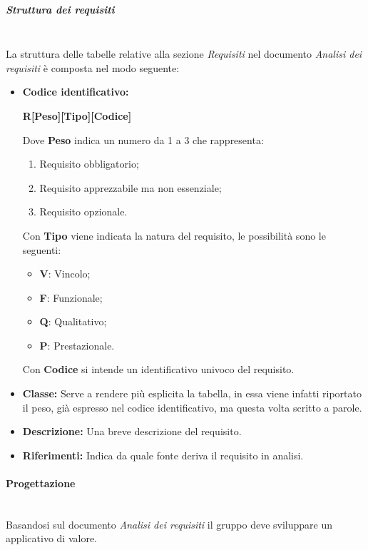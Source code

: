 \subparagraph{Struttura dei requisiti}
\mbox{} \\
La struttura delle tabelle relative alla sezione \textit{Requisiti} nel documento \textit{Analisi dei requisiti} è composta nel modo seguente:
\begin{itemize}
    \item   \textbf{Codice identificativo:}
            \par \centerline{\textbf{R[Peso][Tipo][Codice]}}
            Dove \textbf{Peso} indica un numero da 1 a 3 che rappresenta:
            \begin{enumerate}
                \item Requisito obbligatorio;
                \item Requisito apprezzabile ma non essenziale;
                \item Requisito opzionale.
            \end{enumerate}
            Con \textbf{Tipo} viene indicata la natura del requisito, le possibilità sono le seguenti:
            \begin{itemize}
                \item \textbf{V}: Vincolo;
                \item \textbf{F}: Funzionale;
                \item \textbf{Q}: Qualitativo;
                \item \textbf{P}: Prestazionale.
            \end{itemize}
            Con \textbf{Codice} si intende un identificativo univoco del requisito.
    \item \textbf{Classe:} Serve a rendere più esplicita la tabella, in essa viene infatti riportato il peso, già espresso nel codice identificativo, ma questa volta scritto a parole.
    \item \textbf{Descrizione:} Una breve descrizione del requisito.
    \item \textbf{Riferimenti:} Indica da quale fonte deriva il requisito in analisi.
\end{itemize}

\paragraph{Progettazione}
\mbox{} \\
Basandosi sul documento \textit{Analisi dei requisiti} il gruppo deve sviluppare
un applicativo di valore. \\

